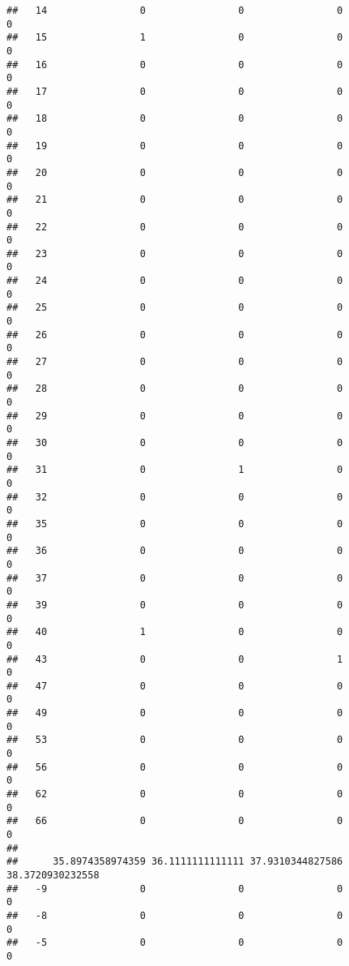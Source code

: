 \documentclass[]{article}
\begin{document}
\begin{verbatim}
##   14                0                0                0                0
##   15                1                0                0                0
##   16                0                0                0                0
##   17                0                0                0                0
##   18                0                0                0                0
##   19                0                0                0                0
##   20                0                0                0                0
##   21                0                0                0                0
##   22                0                0                0                0
##   23                0                0                0                0
##   24                0                0                0                0
##   25                0                0                0                0
##   26                0                0                0                0
##   27                0                0                0                0
##   28                0                0                0                0
##   29                0                0                0                0
##   30                0                0                0                0
##   31                0                1                0                0
##   32                0                0                0                0
##   35                0                0                0                0
##   36                0                0                0                0
##   37                0                0                0                0
##   39                0                0                0                0
##   40                1                0                0                0
##   43                0                0                1                0
##   47                0                0                0                0
##   49                0                0                0                0
##   53                0                0                0                0
##   56                0                0                0                0
##   62                0                0                0                0
##   66                0                0                0                0
##     
##      35.8974358974359 36.1111111111111 37.9310344827586 38.3720930232558
##   -9                0                0                0                0
##   -8                0                0                0                0
##   -5                0                0                0                0

\end{verbatim}
\end{document}
